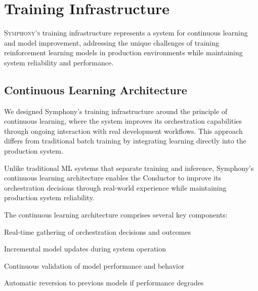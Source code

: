 
\section*{Training Infrastructure}

\lettrine{S}{ymphony's} training infrastructure represents a system for continuous learning and model improvement, addressing the unique challenges of training reinforcement learning models in production environments while maintaining system reliability and performance.

\subsection*{Continuous Learning Architecture}

We designed Symphony's training infrastructure around the principle of continuous learning, where the system improves its orchestration capabilities through ongoing interaction with real development workflows. This approach differs from traditional batch training by integrating learning directly into the production system.

\begin{infobox}[title=Production Learning Integration]
Unlike traditional ML systems that separate training and inference, Symphony's continuous learning architecture enables the Conductor to improve its orchestration decisions through real-world experience while maintaining production system reliability.
\end{infobox}

The continuous learning architecture comprises several key components:

\begin{description}[leftmargin=4cm,labelwidth=3.5cm]
    \item[\textbf{Experience Collection}] Real-time gathering of orchestration decisions and outcomes
    \item[\textbf{Online Training}] Incremental model updates during system operation
    \item[\textbf{Safety Monitoring}] Continuous validation of model performance and behavior
    \item[\textbf{Rollback Mechanisms}] Automatic reversion to previous models if performance degrades
\end{description}

